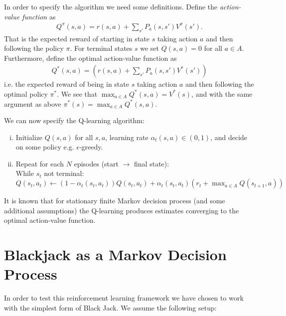 In order to specify the algorithm we need some definitions. Define the \textit{action-value function} as
\begin{align*}
	Q^{\pi} ( s,a  ) = r(s,a) + \sum_{s'} P_{a}(s,s')V^{\pi}(s').
\end{align*}
That is the expected reward of starting in state $s$ taking action $a$ and then following the policy $\pi$. For terminal states $s$ we set $Q(s,a)=0$ for all $a\in A$. Furthermore, define the optimal action-value function as
\begin{align*}
Q^*  ( s,a  ) =  (r(s,a) + \sum_{s'} P_{a}(s,s')V^{* }(s'))
\end{align*}
i.e. the expected reward of being in state $s$ taking action $a$ and then following the optimal policy $\pi^*$. We see that $\max_{a \in A} Q^*(s,a) = V^*(s)$, and 
with the same argument as above $\pi^*(s) = \max_{a \in A}Q^*(s,a)$. 

We can now specify the Q-learning algorithm:

\begin{enumerate}[(i)]
	\item Initialize $Q(s,a)$ for all $s,a$, learning rate $\alpha_t(s,a) \in (0,1)$, and decide on some policy e.g. $\epsilon$-greedy.
	\item Repeat for each $N$ episodes (start $\to$ final state): \\
	While $s_t$ not terminal:  $Q(s_t,a_t)  \leftarrow (1-\alpha_t(s_t,a_t))Q(s_t,a_t) + \alpha_t(s_t,a_t)( r_t + \max_{a \in A} Q(s_{t+1},a) )$
\end{enumerate}
It is known that for stationary finite Markov decision process (and some additional assumptions) the Q-learning produces estimates converging to the optimal action-value function.


\section*{Blackjack as a Markov Decision Process}
In order to test this reinforcement learning framework we have chosen to work with the simplest form of Black Jack. We assume the following setup:

